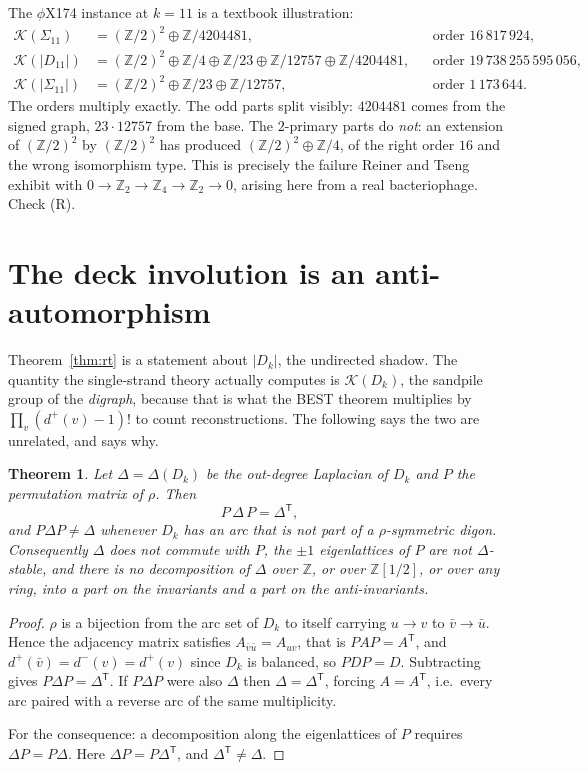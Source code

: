 \documentclass[11pt]{article}
\theoremstyle{plain}
\newtheorem{theorem}{Theorem}
\theoremstyle{definition}
\theoremstyle{remark}
\newcommand{\Z}{\mathbb{Z}}
\newcommand{\K}{\mathcal{K}}
\newcommand{\Sig}{\Sigma}
\begin{document}
The $\phi$X174 instance at $k=11$ is a textbook illustration:
\[
\begin{aligned}
  \K(\Sig_{11})   &= (\Z/2)^2\oplus\Z/4204481, &&\text{order } 16\,817\,924,\\
  \K(|D_{11}|)    &= (\Z/2)^2\oplus\Z/4\oplus\Z/23\oplus\Z/12757\oplus\Z/4204481,
                  &&\text{order } 19\,738\,255\,595\,056,\\
  \K(|\Sig_{11}|) &= (\Z/2)^2\oplus\Z/23\oplus\Z/12757, &&\text{order } 1\,173\,644 .
\end{aligned}
\]
The orders multiply exactly. The odd parts split visibly: $4204481$ comes from the signed
graph, $23\cdot 12757$ from the base. The $2$-primary parts do \emph{not}: an extension of
$(\Z/2)^2$ by $(\Z/2)^2$ has produced $(\Z/2)^2\oplus\Z/4$, of the right order $16$ and the
wrong isomorphism type. This is precisely the failure Reiner and Tseng exhibit with
$0\to\Z_2\to\Z_4\to\Z_2\to 0$, arising here from a real bacteriophage. Check (R).

\section{The deck involution is an anti-automorphism}

Theorem~\ref{thm:rt} is a statement about $|D_k|$, the undirected shadow. The quantity the
single-strand theory actually computes is $\K(D_k)$, the sandpile group of the
\emph{digraph}, because that is what the BEST theorem multiplies by
$\prod_v(d^+(v)-1)!$ to count reconstructions. The following says the two are unrelated, and
says why.

\begin{theorem}\label{thm:anti}
Let $\Delta=\Delta(D_k)$ be the out-degree Laplacian of $D_k$ and $P$ the permutation matrix
of $\rho$. Then
\[
  P\,\Delta\,P=\Delta^{\mathsf T},
\]
and $P\Delta P\ne\Delta$ whenever $D_k$ has an arc that is not part of a $\rho$-symmetric
digon. Consequently $\Delta$ does not commute with $P$, the $\pm1$ eigenlattices of $P$ are
not $\Delta$-stable, and there is no decomposition of $\Delta$ over $\Z$, or over
$\Z[1/2]$, or over any ring, into a part on the invariants and a part on the anti-invariants.
\end{theorem}

\begin{proof}
$\rho$ is a bijection from the arc set of $D_k$ to itself carrying $u\to v$ to
$\bar v\to\bar u$. Hence the adjacency matrix satisfies $A_{\bar v\bar u}=A_{uv}$, that is
$PAP=A^{\mathsf T}$, and $d^+(\bar v)=d^-(v)=d^+(v)$ since $D_k$ is balanced, so $PDP=D$.
Subtracting gives $P\Delta P=\Delta^{\mathsf T}$. If $P\Delta P$ were also $\Delta$ then
$\Delta=\Delta^{\mathsf T}$, forcing $A=A^{\mathsf T}$, i.e.\ every arc paired with a reverse
arc of the same multiplicity.

For the consequence: a decomposition along the eigenlattices of $P$ requires
$\Delta P=P\Delta$. Here $\Delta P=P\Delta^{\mathsf T}$, and $\Delta^{\mathsf T}\ne\Delta$.
\end{proof}
\end{document}
